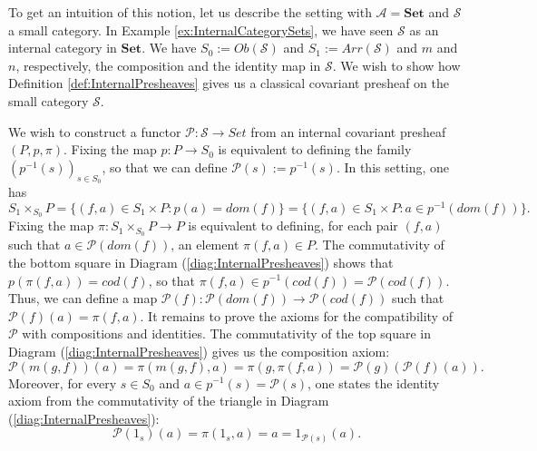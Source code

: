 \begin{example}
\label{ex:InternalPresheavesSets}
    To get an intuition of this notion, let us describe the setting with $\mathcal{A} = \textbf{Set}$ and $\mathcal{S}$ a small category. In Example \ref{ex:InternalCategorySets}, we have seen $\mathcal{S}$ as an internal category in $\textbf{Set}$. We have $S_0 := Ob(\mathcal{S})$ and $S_1:=Arr(\mathcal{S})$ and $m$ and $n$, respectively, the composition and the identity map in $\mathcal{S}$. We wish to show how Definition \ref{def:InternalPresheaves} gives us a classical covariant presheaf on the small category $\mathcal{S}$. 
    
    We wish to construct a functor $\mathcal{P}:\mathcal{S}\longrightarrow Set$ from an internal covariant presheaf $(P,p,\pi)$. Fixing the map $p:P\to S_0$ is equivalent to defining the family $(p^{-1}(s))_{s\in S_0}$, so that we can define $\mathcal{P}(s):=p^{-1}(s)$.
    In this setting, one has
    \[ S_1\times_{S_0}P = \{(f,a)\in S_1\times P:p(a)=dom(f)\}=\{(f,a)\in S_1\times P:a\in p^{-1}(dom(f))\}. \]
    Fixing the map $\pi:S_1\times_{S_0}P\to P$ is equivalent to defining, for each pair $(f,a)$ such that $a\in\mathcal{P}(dom(f))$, an element $\pi(f,a) \in P$. The commutativity of the bottom square in Diagram (\ref{diag:InternalPresheaves}) shows that $p(\pi(f,a))=cod(f)$, so that $\pi(f,a)\in p^{-1}(cod(f))=\mathcal{P}(cod(f))$.
    Thus, we can define a map $\mathcal{P}(f):\mathcal{P}(dom(f))\to\mathcal{P}(cod(f))$ such that $\mathcal{P}(f)(a) = \pi(f,a)$.
    It remains to prove the axioms for the compatibility of $\mathcal{P}$ with compositions and identities.
    The commutativity of the top square in Diagram (\ref{diag:InternalPresheaves}) gives us the composition axiom:
    \[ \mathcal{P}(m(g,f))(a) = \pi(m(g,f),a) = \pi(g,\pi(f,a)) = \mathcal{P}(g)(\mathcal{P}(f)(a)). \]
    Moreover, for every $s\in S_0$ and $a\in p^{-1}(s)=\mathcal{P}(s)$, one states the identity axiom from the commutativity of the triangle in Diagram (\ref{diag:InternalPresheaves}):
    \[ \mathcal{P}(1_s)(a) = \pi(1_s,a) = a = 1_{\mathcal{P}(s)}(a). \]
\end{example}

